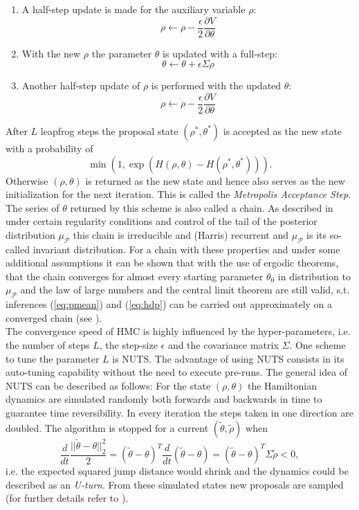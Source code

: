 \documentclass[12pt,letterpaper]{article}
\numberwithin{equation}{subsection}
\begin{document}
\begin{enumerate}
\item A half-step update is made for the auxiliary variable $\rho$: \[ \rho \leftarrow \rho - \frac{\epsilon}{2}\frac{\partial{V}}{\partial{\theta}} \]
\item With the new $\rho$ the parameter $\theta$ is updated with a full-step: \[
\theta \leftarrow  \theta  + \epsilon \Sigma \rho
\]
\item Another half-step update of $\rho$ is performed with the updated $\theta$: \[
\rho \leftarrow \rho - \frac{\epsilon}{2}\frac{\partial{V}}{\partial{\theta}}
\]
\end{enumerate}  
After $L$ leapfrog steps the proposal state $(\rho^*,\theta^*)$ is accepted as the new state with a probability of 
\[\min(1, \exp(H(\rho, \theta)-H(\rho^*,\theta^*))).
\] Otherwise $(\rho, \theta)$ is returned as the new state and hence also serves as the new initialization for the next iteration. This is called the \textit{Metropolis Acceptance Step}.\\
 The series of $\theta$ returned by this scheme is also called a chain. As described in \cite{convhmc} under certain regularity conditions and control of the tail of the posterior distribution $\mu_\mathcal{P}$ this chain is irreducible and (Harris) recurrent and $\mu_\mathcal{P}$ is its so-called invariant distribution. For a chain with these properties and under some additional assumptions it can be shown that with the use of ergodic theorems, that the chain  converges for almost every starting parameter $\theta_0$ in distribution to $\mu_\mathcal{P}$ and the law of large numbers and the central limit theorem are still valid, s.t. 
inferences (\ref{eq:pmean}) and (\ref{eq:hdp}) can be carried out approximately on a converged chain (see \cite{mcstability}). \\
The convergence speed of HMC is highly influenced by the hyper-parameters, i.e. the number of steps $L$, the step-size $\epsilon$ and the covariance matrix $\Sigma$.
One scheme to tune the parameter $L$ is NUTS. The advantage of using NUTS consists in its auto-tuning capability without the need to execute pre-runs. The general idea of NUTS can be described as follows: For the state $(\rho,\theta)$ the Hamiltonian dynamics are simulated randomly both forwards and backwards in time to guarantee time reversibility. In every iteration the steps taken in one direction are doubled. The algorithm is stopped for a current $(\tilde{\theta},\tilde{\rho})$ when 
\begin{equation*}
\frac{d}{dt}\frac{||\tilde{\theta} - \theta||^2_2}{2} = (\tilde{\theta} -\theta )^T\frac{d}{dt}(\tilde{\theta} - \theta) = (\tilde{\theta} -\theta )^T\Sigma\tilde{\rho} < 0,
\end{equation*} i.e. the expected squared jump distance would shrink and the dynamics could be described as an \textit{U-turn}. From these simulated states new proposals are sampled (for further details refer to \cite{nuts}). 
\label{sec:HMC}
\end{document}
